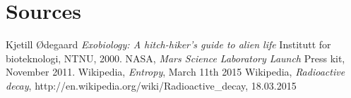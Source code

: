 \section*{Sources}

\begin{thebibliography}{99}	%
		Kjetill Ødegaard
		\emph{Exobiology: A hitch-hiker's guide to alien life}
		Institutt for bioteknologi,
		NTNU,
		2000.
		NASA,
		\emph{Mars Science Laboratory Launch}
		Press kit,
		November 2011.
		Wikipedia,
		\emph{Entropy},
		March 11th 2015
		Wikipedia,
		\emph{Radioactive decay},
		http://en.wikipedia.org/wiki/Radioactive_decay,
		18.03.2015
	
	
	
\end{thebibliography}